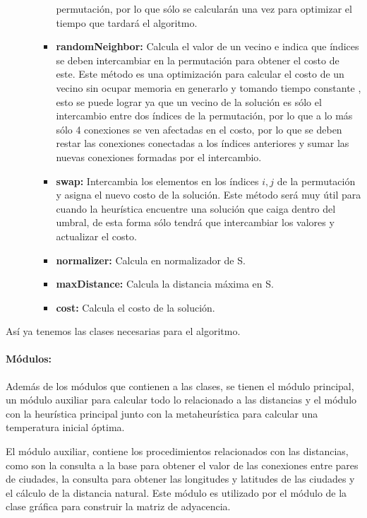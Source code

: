\documentclass[12pt]{article}
\begin{document}
\begin{enumerate}
\begin{enumerate}
\begin{itemize}
		permutación, por lo que sólo se calcularán una vez para optimizar el tiempo 
		que tardará el algoritmo.
		\item \textbf{randomNeighbor:} Calcula el valor de un vecino e indica que índices
		se deben intercambiar en la permutación para obtener el costo de este. Este 
		método es una optimización para calcular el costo de un vecino sin
		ocupar memoria en generarlo y tomando tiempo constante , esto
		se puede lograr ya que un vecino de la solución es sólo el intercambio entre dos
		índices de la permutación, por lo que a lo más sólo 4 conexiones se ven afectadas
		en el costo, por lo que se deben restar las conexiones conectadas a los índices
		anteriores y sumar las nuevas conexiones formadas por el intercambio. 
		\item \textbf{swap:} Intercambia los elementos en los índices $i,j$ de la 
		permutación y asigna el nuevo costo de la solución. Este método será muy útil 
		para cuando la heurística encuentre una	solución que caiga dentro del umbral, de
		esta forma sólo tendrá que intercambiar los valores y actualizar el costo.
		\item \textbf{normalizer: } Calcula en normalizador de S.
		\item \textbf{maxDistance: } Calcula la distancia máxima en S.
		\item \textbf{cost: } Calcula el costo de la solución.
	\end{itemize}
	\end{enumerate}
	\end{enumerate}
	
	Así ya tenemos las clases necesarias para el algoritmo.
	
	\paragraph{Módulos:} 
	Además de los módulos que contienen a las clases, se tienen el módulo principal, un
	módulo auxiliar para calcular todo lo relacionado a las distancias y el módulo con
	la heurística principal junto con la metaheurística para calcular una temperatura
	inicial óptima.
	
	El módulo auxiliar, contiene los procedimientos relacionados con las distancias, 
	como son la consulta a la base para obtener el valor de las conexiones entre pares
	de ciudades, la consulta para obtener las longitudes y latitudes de las ciudades y el
	cálculo de la distancia natural. Este módulo es utilizado por el módulo de la clase
	gráfica para construir la matriz de adyacencia.
	
\end{document}
